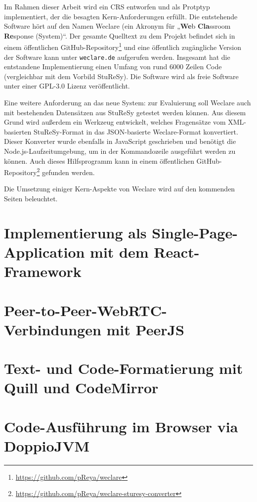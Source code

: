Im Rahmen dieser Arbeit wird ein CRS entworfen und als Protptyp implementiert, der die besagten Kern-Anforderungen erfüllt. Die entstehende Software hört auf den Namen Weclare (ein Akronym für „\textbf{We}b \textbf{Cla}ssroom \textbf{Re}sponse (System)“. Der gesamte Quelltext zu dem Projekt befindet sich in einem öffentlichen GitHub-Repository\footnote{\url{https://github.com/pReya/weclare}} und eine öffentlich zugängliche Version der Software kann unter \texttt{weclare.de} aufgerufen werden. Insgesamt hat die entstandene Implementierung einen Umfang von rund 6000 Zeilen Code (vergleichbar mit dem Vorbild StuReSy). Die Software wird als freie Software unter einer GPL-3.0 Lizenz veröffentlicht.

Eine weitere Anforderung an das neue System: zur Evaluierung soll Weclare auch mit bestehenden Datensätzen aus StuReSy getestet werden können. Aus diesem Grund wird außerdem ein Werkzeug entwickelt, welches Fragensätze vom XML-basierten StuReSy-Format in das JSON-basierte Weclare-Format konvertiert. Dieser Konverter wurde ebenfalls in JavaScript geschrieben und benötigt die Node.js-Laufzeitumgebung, um in der Kommandozeile ausgeführt werden zu können. Auch dieses Hilfsprogramm kann in einem öffentlichen GitHub-Repository\footnote{\url{https://github.com/pReya/weclare-sturesy-converter}} gefunden werden. 

Die Umsetzung einiger Kern-Aspekte von Weclare wird auf den kommenden Seiten beleuchtet.

\newpage
\section{Implementierung als Single-Page-Application mit dem React-Framework}
\label{chap:react_einfuehrung}


\newpage
\section{Peer-to-Peer-WebRTC-Verbindungen mit PeerJS}
\label{chap:p2p}


\newpage
\section{Text- und Code-Formatierung mit Quill und CodeMirror}
\label{chap:formatierung}


\newpage
\section{Code-Ausführung im Browser via DoppioJVM}
\label{chap:ausfuehrung}
